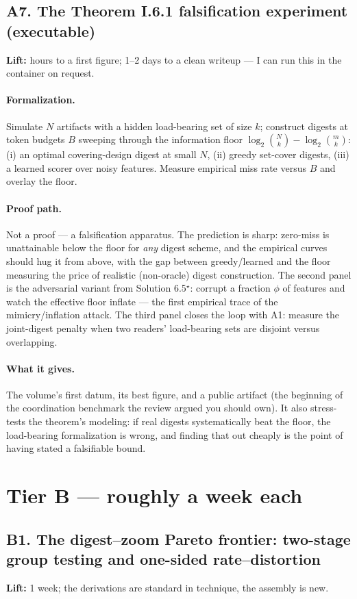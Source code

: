 \documentclass[11pt,a4paper]{article}
\newcommand{\lift}[1]{\noindent\textbf{Lift:} #1.}
\newcommand{\gives}{\paragraph{What it gives.}}
\newcommand{\form}{\paragraph{Formalization.}}
\newcommand{\proofpath}{\paragraph{Proof path.}}
\begin{document}
\subsection{A7. The Theorem I.6.1 falsification experiment (executable)}
\lift{hours to a first figure; 1--2 days to a clean writeup --- I can run this in the container on request}

\form Simulate $N$ artifacts with a hidden load-bearing set of size $k$; construct digests at token budgets $B$ sweeping through the information floor $\log_2\binom{N}{k} - \log_2\binom{m}{k}$: (i) an optimal covering-design digest at small $N$, (ii) greedy set-cover digests, (iii) a learned scorer over noisy features. Measure empirical miss rate versus $B$ and overlay the floor.

\proofpath Not a proof --- a falsification apparatus. The prediction is sharp: zero-miss is unattainable below the floor for \emph{any} digest scheme, and the empirical curves should hug it from above, with the gap between greedy/learned and the floor measuring the price of realistic (non-oracle) digest construction. The second panel is the adversarial variant from Solution 6.5$^\star$: corrupt a fraction $\phi$ of features and watch the effective floor inflate --- the first empirical trace of the mimicry/inflation attack. The third panel closes the loop with A1: measure the joint-digest penalty when two readers' load-bearing sets are disjoint versus overlapping.

\gives The volume's first datum, its best figure, and a public artifact (the beginning of the coordination benchmark the review argued you should own). It also stress-tests the theorem's modeling: if real digests systematically beat the floor, the load-bearing formalization is wrong, and finding that out cheaply is the point of having stated a falsifiable bound.

\section{Tier B --- roughly a week each}

\subsection{B1. The digest--zoom Pareto frontier: two-stage group testing and one-sided rate--distortion}
\lift{1 week; the derivations are standard in technique, the assembly is new}
\end{document}
